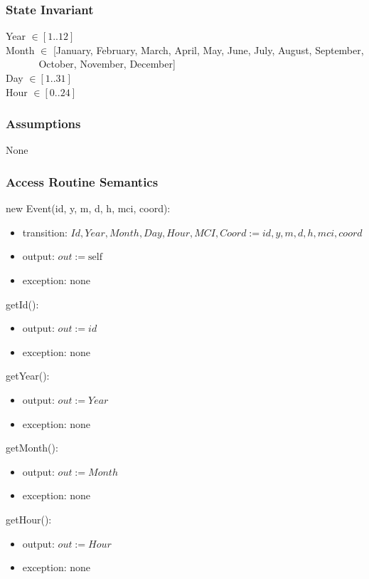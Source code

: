 \documentclass[12pt]{article}
\begin{document}
\subsubsection* {State Invariant}
Year $\in [1..12]$\\
Month $\in$ [January, February, March, April, May, June, July, August, September, \\
$~~~~~~~~~~~~~~~$October, November, December]\\
Day $\in [1..31]$\\
Hour $\in [0..24]$\\

\subsubsection* {Assumptions}

 None
 
\subsubsection* {Access Routine Semantics}

\noindent new Event(id, y, m, d, h, mci, coord):
\begin{itemize}
\item transition: $Id, Year, Month, Day, Hour, MCI, Coord := id, y, m, d, h, mci, coord$
\item output: $out := \mbox{self}$
\item exception: none
\end{itemize}

\noindent getId():
\begin{itemize}
\item output: $out := id$
\item exception: none
\end{itemize}

\noindent getYear():
\begin{itemize}
\item output: $out := Year$
\item exception: none
\end{itemize}

\noindent getMonth():
\begin{itemize}
\item output: $out := Month$
\item exception: none
\end{itemize}

\noindent getHour():
\begin{itemize}
\item output: $out := Hour$
\item exception: none
\end{itemize}
\end{document}
